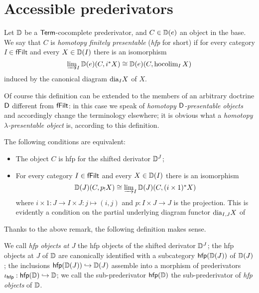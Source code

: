 \documentclass[a4paper,11pt]{amsart}
\def\hfp{{\sf hfp}}
\begin{document}
\section{Accessible prederivators}
\begin{definition}
Let $\mathbb{D}$ be a $\sf Term$-cocomplete prederivator, and $C\in\mathbb{D}(e)$ an object in the base. We say that $C$ is \emph{homotopy finitely presentable} (\emph{hfp} for short) if for every category $I\in\textsf{fFilt}$ and every $X\in\mathbb{D}(I)$ there is an isomorphism
\[\textstyle
\varinjlim_I \mathbb{D}(e)(C, i^*X) \cong \mathbb{D}(e)(C, \operatorname{hocolim}_I X)
\]
induced by the canonical diagram $\text{dia}_I X$ of $X$.
\end{definition}
\begin{remark}
Of course this definition can be extended to the members of an arbitrary doctrine $\sf D$ different from $\sf fFilt$: in this case we speak of \emph{homotopy ${\sf D}$-presentable objects} and accordingly change the terminology elsewhere; it is obvious what a \emph{homotopy $\lambda$-presentable object} is, according to this definition.
\end{remark}
\begin{remark}[relativization]
The following conditions are equivalent:
\begin{itemize}
	\item The object $C$ is hfp for the shifted derivator $\mathbb{D}^J$;
	\item For every category $I\in\sf fFilt$ and every $X\in\mathbb{D}(I)$ there is an isomorphism
	\[\textstyle
	\mathbb{D}(J)(C, p_!X)\cong \varinjlim_I \mathbb{D}(J)(C, (i\times 1)^* X)
	\]
	where $i\times 1\colon J\to I\times J\colon j\mapsto (i,j)$ and $p \colon I\times J \to J$ is the projection. This is evidently a condition on the partial underlying diagram functor $\text{dia}_{I,J}X$ of \cite{groth2013derivators}
\end{itemize}
\end{remark}
Thanks to the above remark, the following definition makes sense.
\begin{definition}[the sub-prederivator $\hfp(\D)$]
We call \emph{hfp objects at $J$} the hfp objects of the shifted derivator $\mathbb{D}^J$; the hfp objects at $J$ of $\mathbb{D}$ are canonically identified with a subcategory $\hfp(\D(J))$ of $\mathbb{D}(J)$; the inclusions $\hfp(\D(J)) \hookrightarrow \D(J)$ assemble into a morphism of prederivators $\iota_\hfp : \hfp(\D) \hookrightarrow \D$; we call the sub-prederivator $\hfp(\D)$ the sub-prederivator of \emph{hfp objects} of $\mathbb{D}$.
\end{definition}
\end{document}
